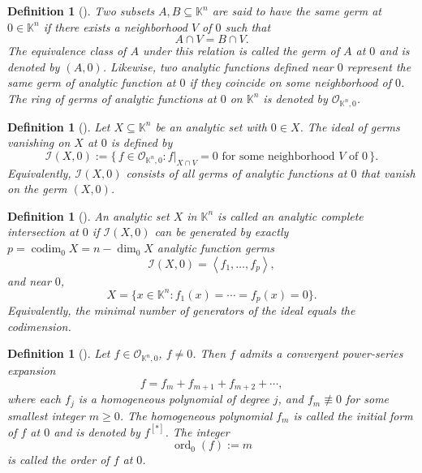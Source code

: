 \documentclass[10pt,reqno]{amsart}
\theoremstyle{break-italic}
\theoremstyle{break-italic}
\theoremstyle{break-italic}
\theoremstyle{break-italic}
\theoremstyle{break-italic}
\theoremstyle{break-italic}
\theoremstyle{break-italic}
\theoremstyle{break-italic}
\theoremstyle{break-roman}
\newtheorem{definition}[satz]{Definition}
\theoremstyle{standard}
\theoremstyle{varthm-roman}
\theoremstyle{varthm-italic}
\theoremstyle{varthm-roman-break}
\theoremstyle{varthm-italic-break}
\theoremstyle{varthm-roman-no-punctuation}
\theoremstyle{varthm-italic-no-punctuation}
\numberwithin{equation}{section}
\newcommand{\seq}[1]{\left<#1\right>}
\begin{document}
\begin{definition}[\cite{Nara85,Chirka89}] \rm 
Two subsets $A,B\subseteq \mathbb K^n$ are said to have the same \emph{germ at $0\in \mathbb K^n$} if there exists a neighborhood $V$ of $0$ such that
\[
A\cap V = B\cap V.
\]
The equivalence class of $A$ under this relation is called the \emph{germ of $A$ at $0$} and is denoted by $(A,0)$. Likewise, two analytic functions defined near $0$ represent the same \emph{germ of analytic function at $0$} if they coincide on some neighborhood of $0$. The ring of germs of analytic functions at $0$ on $\mathbb K^n$ is denoted by $\mathcal O_{\mathbb K^n,0}$.
\end{definition}

\begin{definition}[\cite{Nara85,Chirka89}]\rm 
Let $X\subseteq \mathbb K^n$ be an analytic set with $0\in X$. The \emph{ideal of germs vanishing on $X$ at $0$} is defined by
\[
\mathcal{I}(X,0):=\{\,f\in \mathcal O_{\mathbb K^n,0} : f\vert_{X\cap V}=0
\text{ for some neighborhood }V\text{ of }0\,\}.
\]
Equivalently, $\mathcal{I}(X,0)$ consists of all germs of analytic functions at $0$ that vanish on the germ $(X,0)$.
\end{definition}

\begin{definition}[\cite{GLS07}]\rm An analytic set $X$ in $ \mathbb{K}^n$ is called an \textit{analytic complete intersection at $0$} if $\mathcal{I}(X,0)$ can be generated by exactly $p = \operatorname{codim}_0 X = n-\dim_0 X$ analytic function germs
\[ \mathcal{I}(X,0) = \seq{f_1, \dots, f_p}, \]
and near $0$,
\[ X = \{x \in \mathbb{K}^n : f_1(x) = \cdots = f_p(x) = 0\}. \]
Equivalently, the minimal number of generators of the ideal equals the codimension.
\end{definition}


\begin{definition}[\cite{Nara85,Chirka89}]\rm 
Let $f\in \mathcal O_{\mathbb K^n,0}$, $f\neq 0$. Then $f$ admits a convergent power-series expansion
\[
f = f_m + f_{m+1}+f_{m+2}+\cdots,
\]
where each $f_j$ is a homogeneous polynomial of degree $j$, and $f_m\not\equiv 0$ for some smallest integer $m\ge 0$. The homogeneous polynomial $f_m$ is called the \emph{initial form} of $f$ at $0$ and is denoted by $f^{[\ast]}$. The integer
\[
\operatorname{ord}_0(f):=m
\]
is called the \textit{order of $f$ at $0$}.
\end{definition}
\end{document}
